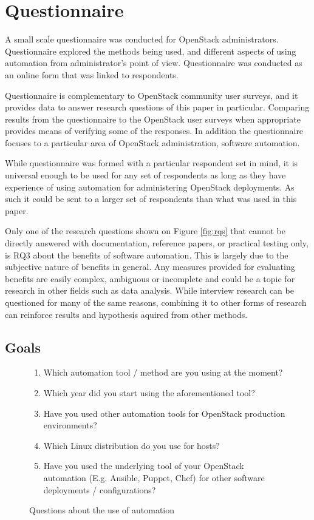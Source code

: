 \documentclass[officiallayout]{tktla}
\begin{document}
\chapter{Questionnaire} \label{questionnaire}

A small scale questionnaire was conducted for OpenStack administrators.
Questionnaire explored the methods being used, and different aspects of using
automation from administrator's point of view. Questionnaire was conducted as
an online form that was linked to respondents.

Questionnaire is complementary to OpenStack community user surveys, and it
provides data to answer research questions of this paper in particular.
Comparing results from the questionnaire to the OpenStack user surveys when
appropriate provides means of verifying some of the responses. In addition the
questionnaire focuses to a particular area of OpenStack administration,
software automation.

While questionnaire was formed with a particular respondent set in mind, it is
universal enough to be used for any set of respondents as long as they have
experience of using automation for administering OpenStack deployments. As such
it could be sent to a larger set of respondents than what was used in this
paper.

Only one of the research questions shown on Figure \ref{fig:rqs} that cannot be
directly answered with documentation, reference papers, or practical testing
only, is RQ3 about the benefits of software automation. This is largely due to
the subjective nature of benefits in general. Any measures provided for
evaluating benefits are easily complex, ambiguous or incomplete and could be a
topic for research in other fields such as data analysis. While interview
research can be questioned for many of the same reasons, combining it to other
forms of research can reinforce results and hypothesis aquired from other
methods.

\section{Goals}

\begin{figure}[t]
\centering
\begin{enumerate}
  \itemsep0em
  \item Which automation tool / method are you using at the moment?
  \item Which year did you start using the aforementioned tool?
  \item Have you used other automation tools for OpenStack production
        environments?
  \item Which Linux distribution do you use for hosts?
  \item Have you used the underlying tool of your OpenStack automation (E.g.
        Ansible, Puppet, Chef) for other software deployments / configurations?
\end{enumerate}
\caption{Questions about the use of automation}
\label{fig:questionnaire-tool-details}
\end{figure}
\end{document}
